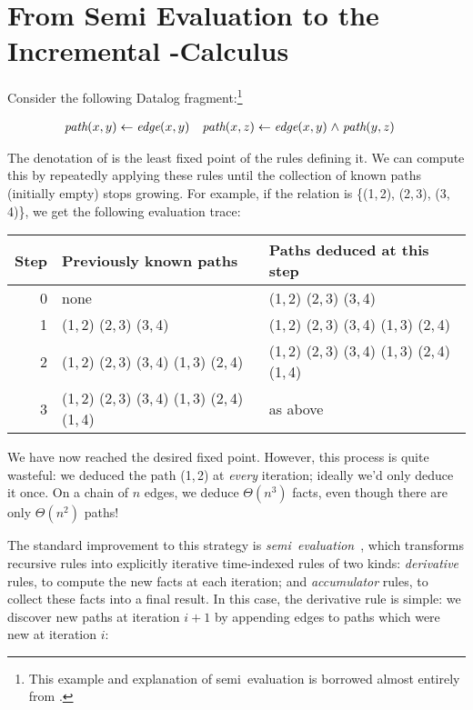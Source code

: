 \section{From Semi\naive{} Evaluation to the Incremental \boldfn-Calculus}
\label{sec:seminaive-and-ilc}

Consider the following Datalog fragment:\footnote{This example and explanation
  of semi\naive\ evaluation is borrowed almost entirely from
  \citet{DBLP:conf/esop/Alvarez-Picallo19}.}

\begin{align*}
  \name{path}(x,y) &\gets \name{edge}(x,y)
  &
  \name{path}(x,z) &\gets \name{edge}(x,y) \wedge \name{path}(y,z)
\end{align*}


\noindent
The denotation of  is the least fixed point of the rules defining
it.
We can compute this by repeatedly applying these rules until the collection
of known paths (initially empty) stops growing.
%
For example, if the  relation is \{(1,\,2), (2,\,3), (3,\,4)\}, we
get the following evaluation trace:

\begin{center}
  \setlength\tabcolsep{1em}
  \begin{tabular}{@{}rll@{}}
    Step
    & Previously known paths
    & Paths deduced at this step
    \\\midrule
    0
    & none
    & (1,\,2) (2,\,3) (3,\,4)
    \\
    1
    & (1,\,2) (2,\,3) (3,\,4)
    & (1,\,2) (2,\,3) (3,\,4) (1,\,3) (2,\,4)
    \\
    2
    & (1,\,2) (2,\,3) (3,\,4) (1,\,3) (2,\,4)
    & (1,\,2) (2,\,3) (3,\,4) (1,\,3) (2,\,4) (1,\,4)
    \\
    3
    & (1,\,2) (2,\,3) (3,\,4) (1,\,3) (2,\,4) (1,\,4)
    & as above
  \end{tabular}
\end{center}

\noindent We have now reached the desired fixed point. However, this process is
quite wasteful: we deduced the path (1,\,2) at \emph{every} iteration; ideally
we'd only deduce it once. On a chain of $n$ edges, we deduce $\Theta(n^3)$
facts, even though there are only $\Theta(n^2)$ paths!

The standard improvement to this strategy is
\emph{semi\naive\ evaluation}~\cite{seminaive}, which transforms recursive rules
into explicitly iterative time-indexed rules of two kinds: \emph{derivative}
rules, to compute the new facts at each iteration; and \emph{accumulator} rules,
to collect these facts into a final result.
%
In this case, the derivative rule is simple: we discover new paths at iteration
$i+1$ by appending edges to paths which were new at iteration $i$:

